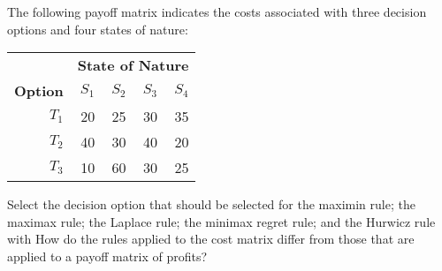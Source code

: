 \begin{exercises}
    \begin{exercise}
    \label{sea-7-39}
        The following payoff matrix indicates the costs associated with three decision options and four states of nature:
        \begin{table}[h]
        \centering
        \begin{tabular}{r r r r r}
        \toprule
         & \multicolumn{4}{c}{\textbf{State of Nature}} \\
        \textbf{Option} & \textbf{$S_1$} & \textbf{$S_2$} & \textbf{$S_3$} & \textbf{$S_4$} \\
        \midrule
        $T_1$ & 20 & 25 & 30 & 35 \\
        $T_2$ & 40 & 30 & 40 & 20 \\
        $T_3$ & 10 & 60 & 30 & 25 \\
        \bottomrule
        \end{tabular}
        \label{tab:sea-7-39} %
        \end{table}
        Select the decision option that should be selected for the maximin rule; the maximax rule; the Laplace rule; the minimax regret rule; and the Hurwicz rule with   How do the rules applied to the cost matrix differ from those that are applied to a payoff matrix of profits?
    \end{exercise}
    \begin{solution}
    \end{solution}
    

\end{exercises}
